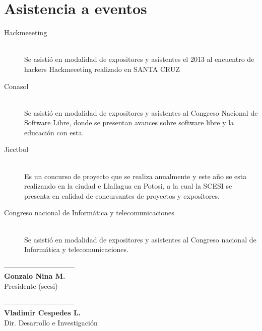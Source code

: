 \documentclass[11pt,letterpaper]{article}
\begin{document}
\section{Asistencia a eventos}
\begin{description}
	\item[Hackmeeeting]~\\
		Se asistió en modalidad de expositores y asistentes el 2013 al encuentro de hackers Hackmeeeting realizado en SANTA CRUZ 
	\item[Conasol]~\\
	  Se asistió en modalidad de expositores y asistentes al Congreso Nacional de Software Libre, donde se presentan avances sobre software libre y la educación con esta. 
	\item[Jicctbol]~\\
		Es un concurso de proyecto que se realiza anualmente y este año se esta realizando en la ciudad e Llallagua en Potosi, a la cual la SCESI se presenta en calidad de concursantes de proyectos y expositores. 
	\item[Congreso nacional de Informática y telecomunicaciones]~\\
		Se asistió en modalidad de expositores y asistentes al Congreso nacional de Informática y telecomunicaciones.
\end{description}

\vspace{3cm}

\begin{minipage}{0.5\textwidth}
\begin{center}
------------------------------\\
{\bf Gonzalo Nina M.}\\
Presidente (scesi)\\
\end{center}
\end{minipage}
\begin{minipage}{0.5\textwidth}
\begin{center}
------------------------------\\
{\bf Vladimir Cespedes L.}\\
Dir. Desarrollo e Investigación\\
\end{center}
\end{minipage}
\end{document}
